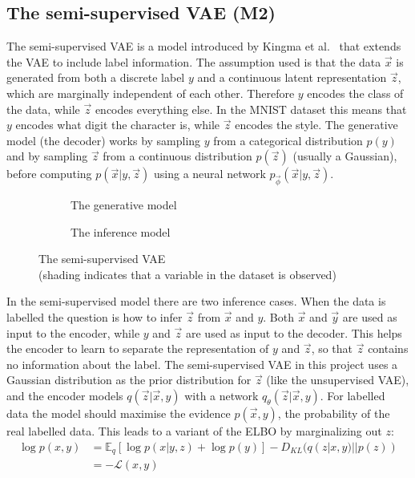 \subsection{The semi-supervised VAE (M2)} \label{ssVAE}

The semi-supervised VAE is a model introduced by Kingma et al.~\cite{DBLP:journals/corr/KingmaRMW14} that extends the VAE to include label information. 
The assumption used is that the data $\vec{x}$ is generated from both a discrete label $y$ and a continuous latent representation 
$\vec{z}$, which are marginally independent of each other.
Therefore $y$ encodes the class of the data, while $\vec{z}$ encodes everything else. In the MNIST dataset this means that $y$ encodes
what digit the character is, while $\vec{z}$ encodes the style. The generative model (the decoder) works by sampling $y$ from a 
categorical distribution $p(y)$ and by sampling $\vec{z}$ from a continuous distribution $p(\vec{z})$ (usually a Gaussian), before computing 
$p(\vec{x}|y, \vec{z})$ using a neural network $p_{\vec{\phi}}(\vec{x}|y, \vec{z})$.
\begin{figure}[H]
  \centering
  \begin{subfigure}[b]{0.4\linewidth}
    \centering
    \scalebox{.75}{}
    \caption{The generative model}
  \end{subfigure}
  \begin{subfigure}[b]{0.4\linewidth}
    \centering
    \scalebox{.75}{}
    \caption{The inference model}
  \end{subfigure}
  \caption[Semi-supervised VAE]{The semi-supervised VAE \\ (shading indicates that a variable in the dataset is observed)}
  \label{fig:ss_vae}
\end{figure}

In the semi-supervised model there are two inference cases. When the data is labelled the question is how to infer $\vec{z}$ from $\vec{x}$ and $y$.
Both $\vec{x}$ and $\vec{y}$ are used as input to the encoder, while $y$ and $\vec{z}$ are used as input to the decoder.
This helps the encoder to learn to separate the representation of $y$ and $\vec{z}$, so that $\vec{z}$ contains
no information about the label. The semi-supervised VAE in this project uses a Gaussian distribution as the prior distribution for 
$\vec{z}$ (like the unsupervised VAE), and the encoder models $q(\vec{z}|\vec{x}, y)$ with a network $q_{\theta}(\vec{z}|\vec{x}, y)$. For labelled data 
the model should 
maximise the evidence $p(\vec{x}, y)$, the probability of the real labelled data. This leads to a variant of the ELBO by marginalizing
out $z$:
\begin{align}
  \log p(x, y) & = \mathbb{E}_q [\log p(x|y, z) + \log p(y)] - D_{KL}(q(z|x, y)||p(z)) \\
  & = -\mathcal{L}(x, y)
\end{align}

